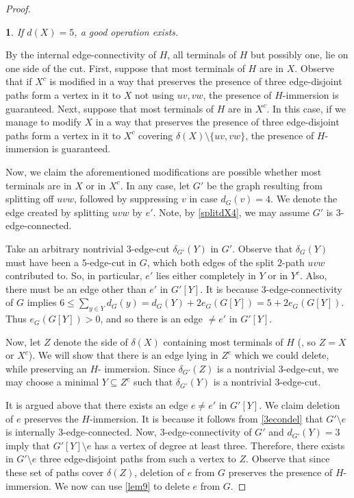 \documentclass[letterpaper,11pt]{article}
\newtheorem{claim}{}[theorem]
\theoremstyle{definition}
\begin{document}
\begin{proof}
\begin{claim}
If $d(X)=5$, a good operation exists.
\end{claim}
By the internal edge-connectivity of $H$, all terminals of $H$ but possibly one, lie on one side of the cut. First, suppose that most terminals of $H$ are in $X$. Observe that if $X^c$ is modified in a way that preserves the presence of three edge-disjoint paths form a vertex in it to $X$ not using $uv, vw$, the presence of $H$-immersion is guaranteed. Next, suppose that most terminals of $H$ are in $X^c$. In this case, if we manage to modify $X$ in a way that preserves the presence of three edge-disjoint paths form a vertex in it to $X^c$ covering $\delta(X)\setminus \{uv,vw\}$, the presence of $H$-immersion is guaranteed. 

Now, we claim the aforementioned modifications are possible whether most terminals are in $X$ or in $X^c$. In any case, let $G'$ be the graph resulting from splitting off $uvw$, followed by suppressing $v$ in case $d_{G}(v)=4$. We denote the edge created by splitting $uvw$ by $e'$. Note, by \ref{splitdX4}, we may assume $G'$ is 3-edge-connected.

Take an arbitrary nontrivial $3$-edge-cut $\delta_{G'}(Y)$ in $G'$. Observe that $\delta_G(Y)$ must have been a $5$-edge-cut in $G$, which both edges of the split $2$-path $uvw$ contributed to. So, in particular, $e'$ lies either completely in $Y$ or in $Y^c$. Also, there must be an edge other than $e'$ in $G'[Y]$. It is because $3$-edge-connectivity of $G$ implies $6\le \sum_{y \in Y} d_G(y)=d_G(Y)+2 e_G(G[Y])=5+2 e_G(G[Y])$. Thus $e_G(G[Y])>0$, and so there is an edge $\neq e'$ in $G'[Y]$.

Now, let $Z$ denote the side of $\delta(X)$ containing most terminals of $H$ (, so $Z=X$ or $X^c$). We will show that there is an edge lying in $Z^c$ which we could delete, while preserving an $H$- immersion. Since $\delta_{G'}(Z)$ is a nontrivial $3$-edge-cut, we may choose a minimal $Y\subseteq Z^c$ such that $\delta_{G'}(Y)$ is a nontrivial $3$-edge-cut.

It is argued above that there exists an edge $e\neq e'$ in $G'[Y]$. We claim deletion of $e$ preserves the $H$-immersion. It is because it follows from \cref{3econdel} that $G'\setminus e$ is internally $3$-edge-connected. Now, $3$-edge-connectivity of $G'$ and $d_{G'}(Y)=3$ imply that $G'[Y]\setminus e$ has a vertex of degree at least three. Therefore, there exists in $G'\setminus e$ three edge-disjoint paths from such a vertex to $Z$. Observe that since these set of paths cover $\delta(Z)$, deletion of $e$ from $G$ preserves the presence of $H$-immersion. We now can use \cref{lem9} to delete $e$ from $G$.
\end{proof}
\end{document}
